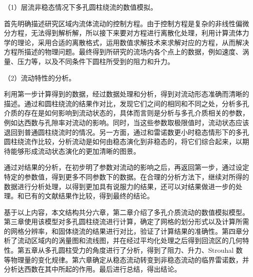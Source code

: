 （1）层流非稳态情况下多孔圆柱绕流的数值模拟。

首先明确描述研究区域内流体流动的控制方程。由于控制方程是复杂的非线性偏微分方程，无法得到解析解，所以接下来要对方程进行离散化处理，利用计算流体力学的理论，采用合适的离散格式，运用数值求解技术来求解对应的方程，从而解决方程所描述的物理问题。最终得到所研究的流场内各个点上的数据，例如速度、涡量、压力等，以及不同条件下圆柱所受到的阻力和升力。

（2）流动特性的分析。

利用第一步计算得到的数据，经过数据处理和分析，得到对流动形态准确而清晰的描述。通过和圆柱绕流的结果作对比，发现它们之间的相同和不同之处，分析多孔介质的存在是如何影响到流动状态的，具体而言则是分析与多孔介质相关的参数，例如达西数与孔隙率对流动的影响。同时，当这些参数取极限值时，流动状态应该退回到普通圆柱绕流时的情况。另一方面，通过和雷诺数更小时稳态情形下的多孔圆柱绕流作比较，分析流动是如何由稳态演化到非稳态的，将它们综合起来，以期待能够形成流动状态演化的更加清晰的图景。

通过对结果的分析，在初步明了参数对流动的影响之后，再返回第一步，通过设定特定的参数值，得到更多不同参数下的数据。在合理的分析方法下，继续对所得的数据进行分析处理，以得到更加具有说服力的结果，还可以对结果做进一步的处理。和已有的文献结果作比较，得到最终的结论。

基于以上内容，本文结构共分六章，第二章介绍了多孔介质流动的数值模拟模型。第三章使用该模型对多孔圆柱绕流进行计算，确定了网格的划分形式以及计算所需的网格分辨率，和固体绕流的结果进行对比，验证了计算结果的准确性。第四章分析了流动区域内的涡量图和流线图，并在经过平均化处理之后得到回流区的几何特性。第五章从多孔圆柱受力的角度进行了分析，得到了阻力、升力、Strouhal 数等物理量的变化规律。第六章确定从稳态流动转变到非稳态流动的临界雷诺数，并分析达西数在其中所起的作用。最后进行总结，得出结论。
